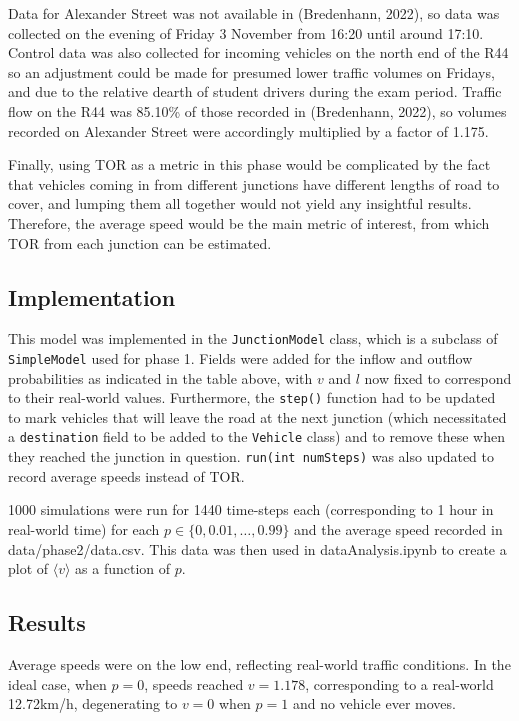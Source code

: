 \documentclass{article}
\begin{document}
Data for Alexander Street was not available in (Bredenhann, 2022), so data was collected on the evening of Friday 3 November from 16:20 until around 17:10. Control data was also collected for incoming vehicles on the north end of the R44 so an adjustment could be made for presumed lower traffic volumes on Fridays, and due to the relative dearth of student drivers during the exam period. Traffic flow on the R44 was 85.10\% of those recorded in (Bredenhann, 2022), so volumes recorded on Alexander Street were accordingly multiplied by a factor of 1.175.

Finally, using TOR as a metric in this phase would be complicated by the fact that vehicles coming in from different junctions have different lengths of road to cover, and lumping them all together would not yield any insightful results. Therefore, the average speed would be the main metric of interest, from which TOR from each junction can be estimated.

\subsection*{Implementation}

This model was implemented in the \texttt{JunctionModel} class, which is a subclass of \texttt{SimpleModel} used for phase 1. Fields were added for the inflow and outflow probabilities as indicated in the table above, with $v$ and $l$ now fixed to correspond to their real-world values. Furthermore, the \texttt{step()} function had to be updated to mark vehicles that will leave the road at the next junction (which necessitated a \texttt{destination} field to be added to the \texttt{Vehicle} class) and to remove these when they reached the junction in question. \texttt{run(int numSteps)} was also updated to record average speeds instead of TOR.

1000 simulations were run for 1440 time-steps each (corresponding to 1 hour in real-world time) for each $p \in \{0, 0.01, \dots , 0.99\}$ and the average speed recorded in data/phase2/data.csv. This data was then used in dataAnalysis.ipynb to create a plot of $\langle v \rangle$ as a function of $p$.

\subsection*{Results}

Average speeds were on the low end, reflecting real-world traffic conditions. In the ideal case, when $p=0$, speeds reached $v=1.178$, corresponding to a real-world 12.72km/h, degenerating to $v=0$ when $p=1$ and no vehicle ever moves.
\end{document}
